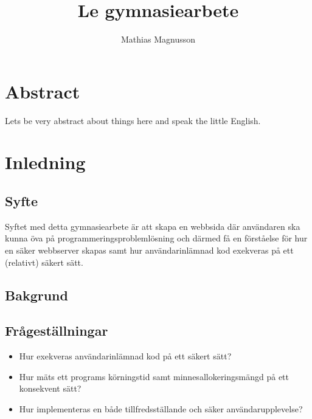 \documentclass{article}
\author{Mathias Magnusson}
\title{Le gymnasiearbete}
\date{}
\begin{document}
\maketitle{}

\section*{Abstract}

Lets be very abstract about things here and speak the little English.

\clearpage

\tableofcontents

\clearpage

\section{Inledning}

\subsection{Syfte}

Syftet med detta gymnasiearbete är att skapa en webbsida där användaren ska
kunna öva på programmeringsproblemlösning och därmed få en förståelse för hur
en säker webbserver skapas samt hur användarinlämnad kod exekveras på ett
(relativt) säkert sätt.

\subsection{Bakgrund}

\subsection{Frågeställningar}

\begin{itemize}
	\item Hur exekveras användarinlämnad kod på ett säkert sätt?
	\item
		Hur mäts ett programs körningstid samt minnesallokeringsmängd på ett
		konsekvent sätt?
	\item
		Hur implementeras en både tillfredsställande och säker
		användarupplevelse?

\end{itemize}

\subsubsection{}
\end{document}
